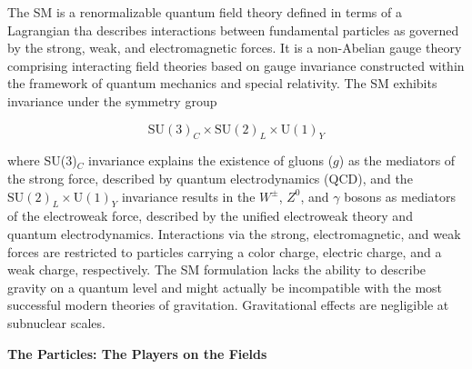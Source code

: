 The SM is a renormalizable quantum field theory defined in terms of a Lagrangian tha describes interactions between fundamental particles as governed by the strong, weak, and electromagnetic forces. It is a non-Abelian gauge theory comprising interacting field theories based on gauge invariance constructed within the framework of quantum mechanics and special relativity. The SM exhibits invariance under the symmetry group

\begin{equation}
    \text{SU}(3)_C \times \text{SU}(2)_L \times \text{U}(1)_Y
\end{equation}

where SU(3)$_C$ invariance explains the existence of gluons ($g$) as the mediators of the strong force, described by quantum electrodynamics (QCD), and the $\text{SU}(2)_L \times \text{U}(1)_Y$ invariance results in the $W^\pm$, $Z^0$, and $\gamma$ bosons as mediators of the electroweak force, described by the unified electroweak theory and quantum electrodynamics. Interactions via the strong, electromagnetic, and weak forces are restricted to particles carrying a color charge, electric charge, and a weak charge, respectively. The SM formulation lacks the ability to describe gravity on a quantum level and might actually be incompatible with the most successful modern theories of gravitation. Gravitational effects are negligible at subnuclear scales.




\textbf{The Particles: The Players on the Fields}

